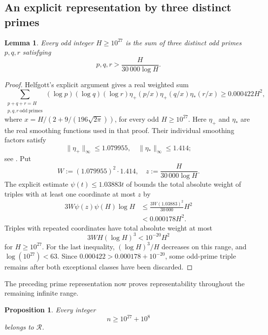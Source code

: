 \documentclass[11pt,letterpaper,reqno]{amsart}
\numberwithin{equation}{section}
\newtheorem{lemma}[theorem]{Lemma}
\newtheorem{proposition}[theorem]{Proposition}
\theoremstyle{remark}
\newcommand{\Rcal}{\mathcal{R}}
\renewcommand{\leq}{\leqslant}
\renewcommand{\geq}{\geqslant}
\begin{document}
\subsection{An explicit representation by three distinct primes}

\begin{lemma}\label{lem:fraiture-balanced-goldbach}
Every odd integer $H\geq10^{27}$ is the sum of three distinct odd primes
$p,q,r$ satisfying
\[
 p,q,r>\frac{H}{30\,000\log H}.
\]
\end{lemma}

\begin{proof}
Helfgott's explicit argument
\cite[\S7.4, equations (7.49)--(7.50)]{Helfgott} gives a real
weighted sum
\[
 \sum_{\substack{p+q+r=H\\p,q,r\ \mathrm{odd\ primes}}}
 (\log p)(\log q)(\log r)
 \eta_+(p/x)\eta_+(q/x)\eta_*(r/x)
 \geq0.000422H^2,
\]
where $x=H/(2+9/(196\sqrt{2\pi}))$, for every odd $H\geq10^{27}$.
Here $\eta_+$ and $\eta_*$ are the real smoothing functions used in
that proof. Their individual smoothing
factors satisfy
\[
 \lVert\eta_+\rVert_\infty\leq1.079955,
 \quad
 \lVert\eta_*\rVert_\infty\leq1.414;
\]
see \cite[equations (7.3) and (7.19)]{Helfgott}. Put
\[
 W:=(1.079955)^2\cdot1.414,
 \quad z:=\frac{H}{30\,000\log H}.
\]
The explicit estimate
$\psi(t)\leq1.03883t$ of
\cite[Theorem~12]{RosserSchoenfeld} bounds the total absolute weight of triples with
at least one coordinate at most $z$ by
\begin{align*}
 3W\psi(z)\psi(H)\log H
 &\leq\frac{3W(1.03883)^2}{30\,000}H^2\\
 &<0.000178H^2.
\end{align*}
Triples with repeated coordinates have total absolute weight at most
\[
 3WH(\log H)^3<10^{-20}H^2
\]
for $H\geq10^{27}$.
For the last inequality, $(\log H)^3/H$ decreases on this range, and
$\log(10^{27})<63$. Since
$0.000422>0.000178+10^{-20}$, some odd-prime triple remains after both
exceptional classes have been discarded.
\end{proof}

The preceding prime representation now proves representability throughout the remaining infinite range.

\begin{proposition}
\label{prop:fraiture-tail}
Every integer
\[
 n\geq10^{27}+10^8
\]
belongs to $\Rcal$.
\end{proposition}
\end{document}
